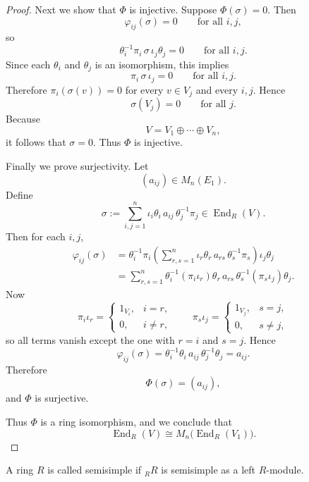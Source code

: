 \begin{proof}
    Next we show that $\Phi$ is injective. Suppose $\Phi(\sigma)=0$. Then
    \[
        \varphi_{ij}(\sigma)=0
        \qquad\text{for all } i,j,
    \]
    so
    \[
        \theta_i^{-1}\pi_i\,\sigma\,\iota_j\theta_j=0
        \qquad\text{for all } i,j.
    \]
    Since each $\theta_i$ and $\theta_j$ is an isomorphism, this implies
    \[
        \pi_i\,\sigma\,\iota_j=0
        \qquad\text{for all } i,j.
    \]
    Therefore $\pi_i(\sigma(v))=0$ for every $v\in V_j$ and every $i,j$. Hence
    \[
        \sigma(V_j)=0
        \qquad\text{for all } j.
    \]
    Because
    \[
        V=V_1\oplus\cdots\oplus V_n,
    \]
    it follows that $\sigma=0$. Thus $\Phi$ is injective.

    Finally we prove surjectivity. Let
    \[
        (a_{ij})\in M_n(E_1).
    \]
    Define
    \[
        \sigma:=\sum_{i,j=1}^n \iota_i\theta_i\,a_{ij}\,\theta_j^{-1}\pi_j
        \in \operatorname{End}_R(V).
    \]
    Then for each $i,j$,
    \begin{align*}
        \varphi_{ij}(\sigma)
         & =\theta_i^{-1}\pi_i
        \left(\sum_{r,s=1}^n \iota_r\theta_r\,a_{rs}\,\theta_s^{-1}\pi_s\right)
        \iota_j\theta_j        \\
         & =\sum_{r,s=1}^n
        \theta_i^{-1}(\pi_i\iota_r)\theta_r\,a_{rs}\,\theta_s^{-1}(\pi_s\iota_j)\theta_j.
    \end{align*}
    Now
    \[
        \pi_i\iota_r=
        \begin{cases}
            1_{V_i}, & i=r,     \\
            0,       & i\neq r,
        \end{cases}
        \qquad
        \pi_s\iota_j=
        \begin{cases}
            1_{V_j}, & s=j,     \\
            0,       & s\neq j,
        \end{cases}
    \]
    so all terms vanish except the one with $r=i$ and $s=j$. Hence
    \[
        \varphi_{ij}(\sigma)
        =\theta_i^{-1}\theta_i\,a_{ij}\,\theta_j^{-1}\theta_j
        =a_{ij}.
    \]
    Therefore
    \[
        \Phi(\sigma)=(a_{ij}),
    \]
    and $\Phi$ is surjective.

    Thus $\Phi$ is a ring isomorphism, and we conclude that
    \[
        \operatorname{End}_R(V)\cong M_n\bigl(\operatorname{End}_R(V_1)\bigr).
    \]
\end{proof}

\begin{definition}
    A ring $R$ is called semisimple if ${}_R R$ is semisimple as a left $R$-module.
\end{definition}

